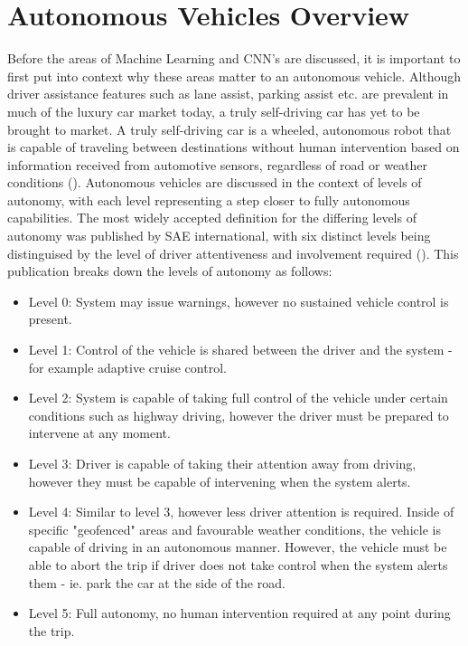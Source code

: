 \documentclass[12pt]{report}
\begin{document}
\section{Autonomous Vehicles Overview}
\begin{flushleft}
Before the areas of Machine Learning and CNN's are discussed, it is important to first put into context why these areas matter to an autonomous vehicle. Although driver assistance features such as lane assist, parking assist etc. are prevalent in much of the luxury car market today, a truly self-driving car has yet to be brought to market. A truly self-driving car is a wheeled, autonomous robot that is capable of traveling between destinations without human intervention based on information received from automotive sensors, regardless of road or weather conditions (\cite{zhao2018key}). Autonomous vehicles are discussed in the context of levels of autonomy, with each level representing a step closer to fully autonomous capabilities. The most widely accepted definition for the differing levels of autonomy was published by SAE international, with six distinct levels being distinguised by the level of driver attentiveness and involvement required (\cite{sae2016taxonomy}). This publication breaks down the levels of autonomy as follows:

\begin{itemize}
\item Level 0: System may issue warnings, however no sustained vehicle control is present.
\item Level 1: Control of the vehicle is shared between the driver and the system - for example adaptive cruise control.
\item Level 2: System is capable of taking full control of the vehicle under certain conditions such as highway driving, however the driver must be prepared to intervene at any moment.
\item Level 3: Driver is capable of taking their attention away from driving, however they must be capable of intervening when the system alerts.
\item Level 4: Similar to level 3, however less driver attention is required. Inside of specific "geofenced" areas and favourable weather conditions, the vehicle is capable of driving in an autonomous manner. However, the vehicle must be able to abort the trip if driver does not take control when the system alerts them - ie. park the car at the side of the road.
\item Level 5: Full autonomy, no human intervention required at any point during the trip.
\end{itemize}
\end{flushleft}
\end{document}
